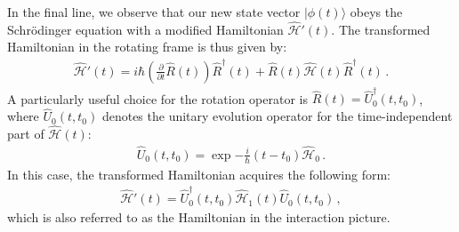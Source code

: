 \documentclass[../Thesis-IJspeert.tex]{subfiles}
\begin{document}
In the final line, we observe that our new state vector $\lvert \phi(t) \rangle$ obeys the Schrödinger equation with a modified Hamiltonian $\hat{\mathcal{H}}'(t)$. The transformed Hamiltonian in the rotating frame is thus given by:
\begin{align}
\hat{\mathcal{H}}'(t) = i \hbar \left( \frac{\partial}{\partial t} \hat{R}(t) \right) \hat{R}^{\dagger}(t) + \hat{R}(t) \hat{\mathcal{H}}(t) \hat{R}^{\dagger}(t)\,.
\end{align}
A particularly useful choice for the rotation operator is $\hat{R}(t) = \hat{U}_0^\dagger(t, t_0)$, where $\hat{U}_0(t, t_0)$ denotes the unitary evolution operator for the time-independent part of $\hat{\mathcal{H}}(t)$:
\begin{align}
\hat{U}_0(t, t_0) = \exp{-\frac{i}{\hbar} (t - t_0) \hat{\mathcal{H}}_0}\,.
\end{align}
In this case, the transformed Hamiltonian acquires the following form:
\begin{align}
\hat{\mathcal{H}}'(t) = \hat{U}_0^{\dagger}(t, t_0) \hat{\mathcal{H}}_1(t) \hat{U}_0(t, t_0)\,,
\end{align}
which is also referred to as the Hamiltonian in the interaction picture.
\end{document}

